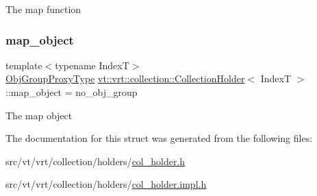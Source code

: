 The map function \mbox{\label{structvt_1_1vrt_1_1collection_1_1_collection_holder_a8f2585c00115e40a4d3617e7c03129a4}} 
\subsubsection{\texorpdfstring{map\+\_\+object}{map\_object}}
{\footnotesize\ttfamily template$<$typename IndexT$>$ \\
\hyperlink{namespacevt_ad7cae989df485fccca57f0792a880a8e}{Obj\+Group\+Proxy\+Type} \hyperlink{structvt_1_1vrt_1_1collection_1_1_collection_holder}{vt\+::vrt\+::collection\+::\+Collection\+Holder}$<$ IndexT $>$\+::map\+\_\+object = no\+\_\+obj\+\_\+group}

The map object 

The documentation for this struct was generated from the following files\+:\begin{DoxyCompactItemize}
\item 
src/vt/vrt/collection/holders/\hyperlink{col__holder_8h}{col\+\_\+holder.\+h}\item 
src/vt/vrt/collection/holders/\hyperlink{col__holder_8impl_8h}{col\+\_\+holder.\+impl.\+h}\end{DoxyCompactItemize}
